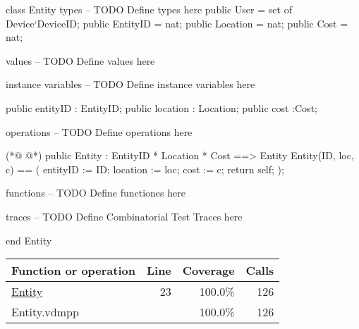\begin{vdmpp}
class Entity
types
-- TODO Define types here
 public User = set of Device`DeviceID;
 public EntityID = nat;
 public Location = nat;
 public Cost = nat;
 
values
-- TODO Define values here

instance variables
-- TODO Define instance variables here

 public entityID : EntityID;
 public location : Location;
 public cost :Cost;
 
 
operations
-- TODO Define operations here
 
(*@
\label{Entity:23}
@*)
 public Entity : EntityID * Location * Cost ==> Entity
  Entity(ID, loc, c) == (  
  entityID := ID;
  location := loc;
  cost := c;
  return self;
  );

functions
-- TODO Define functiones here



traces
-- TODO Define Combinatorial Test Traces here


end Entity
\end{vdmpp}
\bigskip
\begin{longtable}{|l|r|r|r|}
\hline
Function or operation & Line & Coverage & Calls \\
\hline
\hline
\hyperref[Entity:23]{Entity} & 23&100.0\% & 126 \\
\hline
\hline
Entity.vdmpp & & 100.0\% & 126 \\
\hline
\end{longtable}

